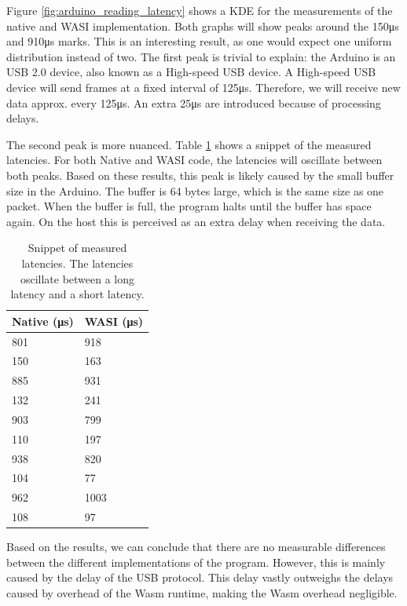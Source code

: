 Figure \ref{fig:arduino_reading_latency} shows a \acrfull{KDE} for the measurements of the native and \acrshort{WASI} implementation.
Both graphs will show peaks around the 150μs and 910μs marks. This is an interesting result, as one would expect one uniform distribution instead of two. The first peak is trivial to explain: the Arduino is an USB 2.0 device, also known as a High-speed USB device. A High-speed USB device will send frames at a fixed interval of 125μs. Therefore, we will receive new data approx. every 125μs. An extra 25μs are introduced because of processing delays. 

The second peak is more nuanced. Table \ref{table:arduino_output} shows a snippet of the measured latencies. For both Native and WASI code, the latencies will oscillate between both peaks. Based on these results, this peak is likely caused by the small buffer size in the Arduino. The buffer is 64 bytes large, which is the same size as one packet. When the buffer is full, the program halts until the buffer has space again. On the host this is perceived as an extra delay when receiving the data.

\begin{table}[h!]
\centering
\begin{tabular}{|l|l|}
\hline
\textbf{Native (μs)} & \textbf{WASI (μs)} \\
\hline
801 & 918 \\
\hline
150 & 163 \\
\hline
885 & 931 \\
\hline
132 & 241 \\
\hline
903 & 799 \\
\hline
110 & 197 \\
\hline
938 & 820 \\
\hline
104 & 77 \\
\hline
962 & 1003 \\
\hline
108 & 97 \\
\hline
\end{tabular}
\caption{Snippet of measured latencies. The latencies oscillate between a long latency and a short latency.}
\label{table:arduino_output}
\end{table}

Based on the results, we can conclude that there are no measurable differences between the different implementations of the program. However, this is mainly caused by the delay of the USB protocol. This delay vastly outweighs the delays caused by overhead of the Wasm runtime, making the Wasm overhead negligible.

